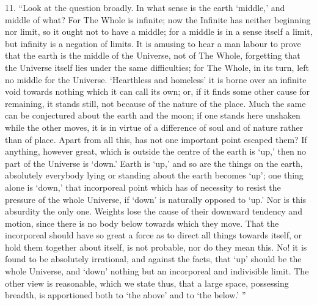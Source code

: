\documentclass[a4paper, 11pt, oneside, polutonikogreek, english]{article}
\begin{document}
11. ``Look at the question broadly. In what sense is the earth `middle,' and middle of what? For The Whole is infinite; now the Infinite has neither beginning nor limit, so it ought not to have a middle; for a middle is in a sense itself a limit, but infinity is a negation of limits. It is amusing to hear a man labour to prove that the earth is the middle of the Universe, not of The Whole, forgetting that the Universe itself lies under the same difficulties; for The Whole, in its turn, left no middle for the Universe. `Hearthless and homeless' it is borne over an infinite void towards nothing which it can call its own; or, if it finds some other cause for remaining, it stands still, not because of the nature of the place. Much the same can be conjectured about the earth and the moon; if one stands here unshaken while the other moves, it is in virtue of a difference of soul and of nature rather than of place. Apart from all this, has not one important point escaped them? If anything, however great, which is outside the centre of the earth is `up,' then no part of the Universe is `down.' Earth is `up,' and so are the things on the earth, absolutely everybody lying or standing about the earth becomes `up'; one thing alone is `down,' that incorporeal point which has of necessity to resist the pressure of the whole Universe, if `down' is naturally opposed to `up.' Nor is this absurdity the only one. Weights lose the cause of their downward tendency and motion, since there is no body below towards which they move. That the incorporeal should have so great a force as to direct all things towards itself, or hold them together about itself, is not probable, nor do they mean this. No! it is found to be absolutely irrational, and against the facts, that `up' should be the whole Universe, and `down' nothing but an incorporeal and indivisible limit. The other view is reasonable, which we state thus, that a large space, possessing breadth, is apportioned both to `the above' and to `the below.' ''
\end{document}
